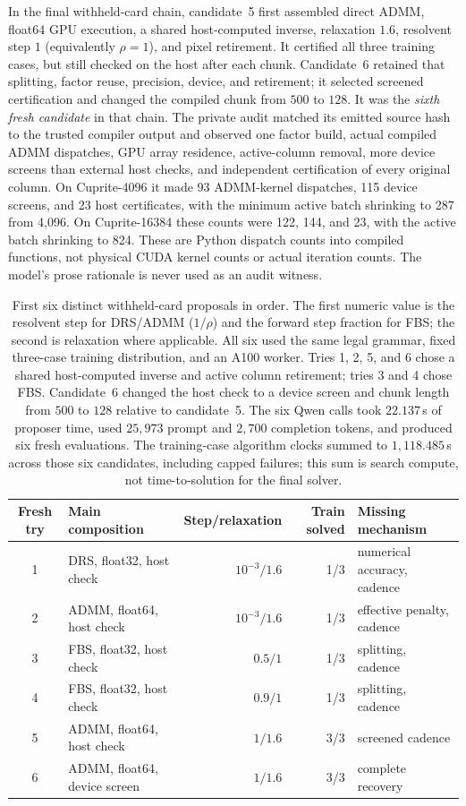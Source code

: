 In the final withheld-card chain, candidate~5 first assembled direct ADMM,
float64 GPU execution, a shared host-computed inverse, relaxation $1.6$,
resolvent step $1$ (equivalently $\rho=1$), and pixel retirement. It certified
all three training cases, but still checked on the host after each chunk.
Candidate~6 retained that splitting, factor reuse, precision, device, and
retirement; it selected screened certification and changed the compiled chunk
from $500$ to $128$. It was the \emph{sixth fresh candidate} in that chain.
The private audit matched its emitted source hash to the trusted compiler output
and observed one factor build, actual compiled ADMM dispatches, GPU array
residence, active-column removal, more device screens than external host checks,
and independent certification of every original column. On Cuprite-4096 it
made 93 ADMM-kernel dispatches, 115 device screens, and 23 host certificates,
with the minimum active batch shrinking to 287 from 4,096. On Cuprite-16384
these counts were 122, 144, and 23, with the active batch shrinking to 824.
These are Python dispatch counts into compiled functions, not physical CUDA
kernel counts or actual iteration counts. The model's prose rationale is never
used as an audit witness.

\begin{table}[t]
\centering\small
\begin{tabular}{clrrl}
\toprule
Fresh try & Main composition & Step/relaxation & Train solved & Missing mechanism \\
\midrule
1 & DRS, float32, host check & $10^{-3}/1.6$ & 1/3 & numerical accuracy, cadence \\
2 & ADMM, float64, host check & $10^{-3}/1.6$ & 1/3 & effective penalty, cadence \\
3 & FBS, float32, host check & $0.5/1$ & 1/3 & splitting, cadence \\
4 & FBS, float32, host check & $0.9/1$ & 1/3 & splitting, cadence \\
5 & ADMM, float64, host check & $1/1.6$ & 3/3 & screened cadence \\
6 & ADMM, float64, device screen & $1/1.6$ & 3/3 & complete recovery \\
\bottomrule
\end{tabular}
\caption{First six distinct withheld-card proposals in order. The first
numeric value is the resolvent step for DRS/ADMM ($1/\rho$) and the forward
step fraction for FBS; the second is relaxation where applicable. All six used
the same legal grammar, fixed three-case training distribution, and an A100
worker. Tries 1, 2, 5, and 6 chose a shared host-computed inverse and active
column retirement; tries 3 and 4 chose FBS. Candidate~6 changed the host
check to a device screen and chunk length from $500$ to $128$ relative to
candidate~5. The six Qwen calls took $22.137$\,s of proposer time, used
$25{,}973$ prompt and $2{,}700$ completion tokens, and produced six fresh
evaluations. The training-case algorithm clocks summed to $1{,}118.485$\,s
across those six candidates, including capped failures; this sum is search
compute, not time-to-solution for the final solver.}
\label{tab:llm-loop-lineage}
\end{table}

